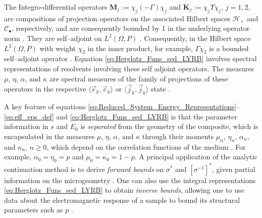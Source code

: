 \documentclass[english,12pt,jmp,graphicx]{revtex4-1}
\begin{document}
The Integro-differential operators $\mathbf{M}_j:=\chi_j(-\Gamma)\chi_j$ and
$\mathbf{K}_j:=\chi_j\Upsilon\chi_j$, $j=1,2$, are compositions of projection
operators on the associated Hilbert spaces $\mathscr{H}_\times$ and
$\mathscr{C}_\bullet$, respectively, and are consequently bounded by 1 in the underlying
operator norm \cite{Rudin:87,Folland:95}. They are self--adjoint on
$L^2(\Omega,P)$ \cite{Golden:CMP-473}. Consequently, in the Hilbert space $L^2(\Omega,P)$
with weight $\chi_2$ in the inner product, for example, $\Gamma\chi_2$ is a 
bounded self--adjoint operator \cite{Golden:CMP-473}. Equation
\eqref{eq:Herglotz_Funs_sed_LYRB} involves spectral representations of
resolvents involving these self adjoint operators. The measures $\mu$,
$\eta$, $\alpha$, and $\kappa$ are spectral measures of the family of projections
of these operators in the respective $\langle\vec{e}_k,\vec{e}_k\rangle$ or
$\langle\vec{j}_k,\vec{j}_k\rangle$ state \cite{Golden:CMP-473,Reed-1980}.   

A key feature of equations
\eqref{eq:Reduced_System_Energy_Representations}--\eqref{eq:eff_eps_def} and
\eqref{eq:Herglotz_Funs_sed_LYRB} is 
that the parameter information in $s$ and $E_0$ is {\it separated}
from the geometry of the composite, which is encapsulated in the 
measures $\mu$, $\eta$, $\alpha$, and $\kappa$ through their moments $\mu_n$, $\eta_n$,
$\alpha_n$, and $\kappa_n$, $n\geq0$, which depend on the correlation functions of the
medium \cite{Golden:CMP-473}. For example, $\alpha_0=\eta_0=p$ and
$\mu_0=\kappa_0=1-p$. A principal application of the analytic continuation
method is to derive \emph{forward bounds} on $\sigma^*$ and $[\sigma^{-1}]^*$, given partial
information on the microgeometry
\cite{Bergman:PRL-1285,Milton:APL-300,Golden:CMP-473,Bergman:AP-78}. One
can also use the integral representations
\eqref{eq:Herglotz_Funs_sed_LYRB} to obtain \emph{inverse bounds},
allowing one to use data about the electromagnetic response of a
sample to bound its structural parameters such as $p$ \cite{Golden:JoB:337}.
\end{document}
